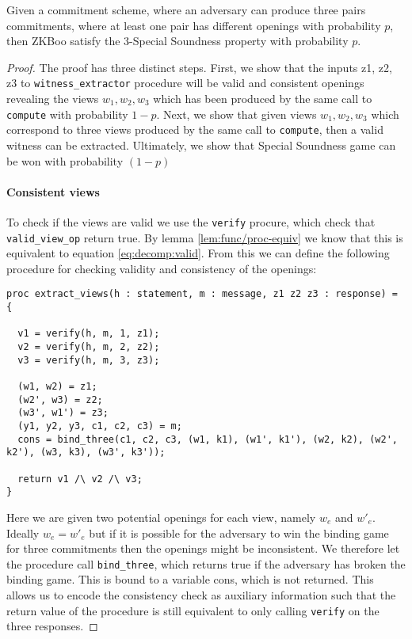 \begin{lemma}
  Given a commitment scheme, where an adversary can produce three pairs
  commitments, where at least one pair has different openings with probability
  $p$, then ZKBoo satisfy the 3-Special Soundness property with probability $p$.
\end{lemma}
\begin{proof}
  The proof has three distinct steps.
  First, we show that the inputs z1, z2, z3 to \texttt{witness\_extractor}
  procedure will be valid and consistent openings revealing the views
  $w_{1}, w_{2}, w_{3}$ which has been produced by the same call to \texttt{compute}
  with probability $1-p$. Next, we show that given views $w_{1}, w_{2}, w_{3}$
  which correspond to three views produced by the same call to \texttt{compute},
  then a valid witness can be extracted.
  Ultimately, we show that Special Soundness game can be won with probability $(1-p)$

  \paragraph{Consistent views}
  To check if the views are valid we use the \texttt{verify} procure, which
  check that \texttt{valid\_view\_op} return true. By lemma
  \ref{lem:func/proc-equiv} we know that this is equivalent to equation
  \ref{eq:decomp:valid}. From this we can define the following procedure for
  checking validity and consistency of the openings:

\begin{lstlisting}[label=lst:zkboo:consistency,caption=Consistency procedure]
proc extract_views(h : statement, m : message, z1 z2 z3 : response) = {

  v1 = verify(h, m, 1, z1);
  v2 = verify(h, m, 2, z2);
  v3 = verify(h, m, 3, z3);

  (w1, w2) = z1;
  (w2', w3) = z2;
  (w3', w1') = z3;
  (y1, y2, y3, c1, c2, c3) = m;
  cons = bind_three(c1, c2, c3, (w1, k1), (w1', k1'), (w2, k2), (w2', k2'), (w3, k3), (w3', k3'));

  return v1 /\ v2 /\ v3;
}
\end{lstlisting}

  Here we are given two potential openings for each view, namely $w_{e}$
  and $w'_{e}$. Ideally $w_{e} = w'_{e}$ but if it is possible for the adversary
  to win the binding game for three commitments then the openings might be
  inconsistent. We therefore let the procedure call \texttt{bind\_three}, which
  returns true if the adversary has broken the binding game. This is bound to a
  variable cons, which is not returned. This allows us to encode the consistency
  check as auxiliary information such that the return value of the procedure is
  still equivalent to only calling \texttt{verify} on the three responses.



\end{proof}

